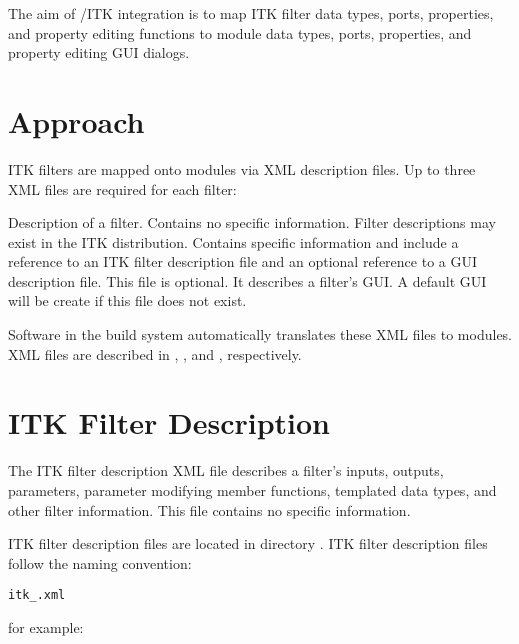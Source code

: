 The aim of \sr{}/ITK integration is to map ITK filter data types,
ports, properties, and property editing functions to \sr{} module data
types, ports, properties, and property editing GUI dialogs.


\section{Approach}
\label{sec:itk_mods:approach}

ITK filters are mapped onto \sr{} modules via XML description files.
Up to three XML files are required for each filter:

\begin{description}
 Description of a filter.  Contains
no \sr{} specific information.  Filter descriptions may exist in the
ITK distribution.
 Contains \sr{} specific
information and include a reference to an ITK filter description file
and an optional reference to a GUI description file.
 This file is optional.  It describes a
filter's GUI.  A default GUI will be create if this file does not exist.
\end{description}

Software in the \sr{} build system automatically translates these XML
files to \sr{} modules.   XML files are described in
,
, and
,
respectively.


\section{ITK Filter Description}
\label{sec:itk_mods:itk_filter_desc}

The ITK filter description XML file describes a filter's inputs,
outputs, parameters, parameter modifying member functions, templated
data types, and other filter information.  This file contains no \sr{}
specific information.  

ITK filter description files are located in
directory . 
ITK filter description files follow the naming convention:

\begin{alltt}
  itk\_.xml
\end{alltt}

for example:

